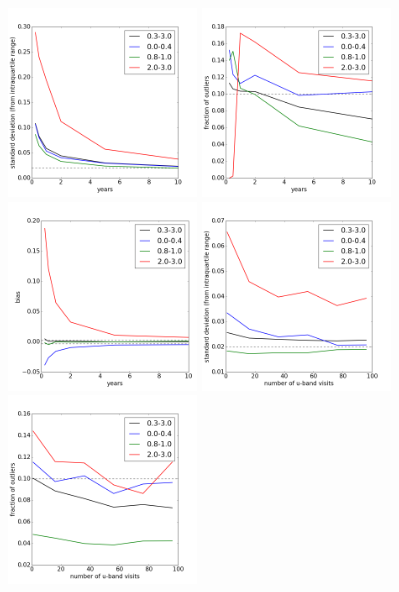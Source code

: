 \begin{figure}[h]
\begin{center}
\includegraphics[width=5cm]{figs/photoz/nyears_IQR.png}
\includegraphics[width=5cm]{figs/photoz/nyears_fout.png}
\includegraphics[width=5cm]{figs/photoz/nyears_bias.png}
\includegraphics[width=5cm]{figs/photoz/uvisits_IQR.png}
\includegraphics[width=5cm]{figs/photoz/uvisits_fout.png}

\end{center}
\end{figure}
